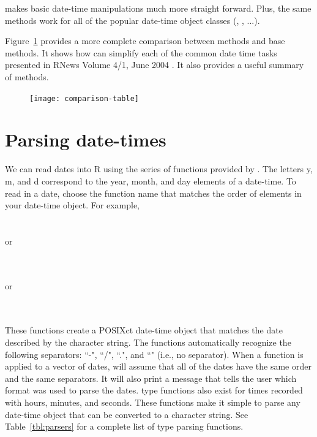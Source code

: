 \documentclass[article]{jss}
\begin{document}
 makes basic date-time manipulations much more straight forward. Plus, the same  methods work for all of the popular date-time object classes (, ,  ...).

Figure~\ref{fig:comparison} provides a more complete comparison between  methods and base  methods. It shows how  can simplify each of the common date time tasks presented in RNews Volume 4/1, June 2004 \citep{Rnews}. It also provides a useful summary of  methods.

\begin{figure}[htpb]
  \texttt{[image: comparison-table]}

  \clearpage

  \label{fig:comparison}

\end{figure}





\section{Parsing date-times}
\label{sec:parsing}

We can read dates into R using the  series of functions provided by . The letters y, m, and d correspond to the year, month, and day elements of a date-time. To read in a date, choose the function name that matches the order of elements in your date-time object. For example,\\

\\
\\

or

\\
\\

or

\\
\\


These functions create a POSIXct date-time object that matches the date described by the character string.  The functions automatically recognize the following separators: ``-", ``/", ``.", and ``" (i.e., no separator). When a  function is applied to a vector of dates,  will assume that all of the dates have the same order and the same separators. It will also print a message that tells the user which format was used to parse the dates.  type functions also exist for times recorded with hours, minutes, and seconds. These functions make it simple to parse any date-time object that can be converted to a character string. See Table~\ref{tbl:parsers} for a complete list of  type parsing functions. 
\end{document}

